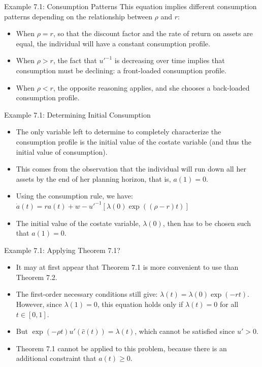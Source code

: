 \documentclass[9pt,aspectratio=169]{beamer}
\begin{document}
\begin{frame}{Example 7.1: Consumption Patterns}
    This equation implies different consumption patterns depending on the
    relationship between $\rho$ and $r$:
    \begin{itemize}
        \item When $\rho = r$, so that the discount factor and the rate of
        return on assets are equal, the individual will have a constant
        consumption profile.
        \item When $\rho > r$, the fact that $u'^{-1}$ is decreasing over
        time implies that consumption must be declining: a front-loaded
        consumption profile.
        \item When $\rho < r$, the opposite reasoning applies, and she
        chooses a back-loaded consumption profile.
    \end{itemize}
\end{frame}

\begin{frame}{Example 7.1: Determining Initial Consumption}
\begin{itemize}
\item The only variable left to determine to completely characterize the consumption profile is the initial value of the costate variable (and thus the initial value of consumption).
\item This comes from the observation that the individual will run down all her assets by the end of her planning horizon, that is, $a(1) = 0$.
\item Using the consumption rule, we have:
$\dot{a}(t) = ra(t) + w - u'^{-1}[\lambda(0) \exp((\rho - r)t)]$
\item The initial value of the costate variable, $\lambda(0)$, then has to be chosen such that $a(1) = 0$.
\end{itemize}
\end{frame}

\begin{frame}{Example 7.1: Applying Theorem 7.1?}
\begin{itemize}
    \item It may at first appear that Theorem 7.1 is more convenient to use
    than Theorem 7.2.
    \item The first-order necessary conditions still give: $\lambda(t) =
    \lambda(0) \exp(-rt)$. However, since $\lambda(1) = 0$, this equation
    holds only if $\lambda(t) = 0$ for all $t \in [0, 1]$.
    \item But $\exp(-\rho t)u'(\hat{c}(t)) = \lambda(t)$, which cannot be
    satisfied since $u' > 0$.
    \item Theorem 7.1 cannot be applied to this problem, because there is an
    additional constraint that $a(t) \geq 0$.
\end{itemize}
\end{frame}
\end{document}
